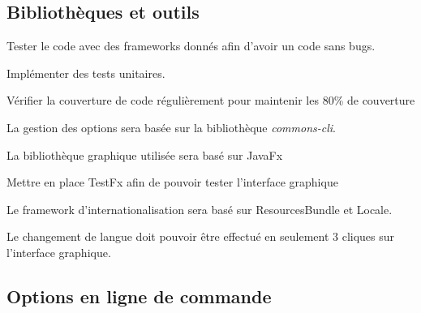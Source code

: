 \documentclass{article}
\begin{document}
\subsection{Bibliothèques et outils}

\begin{nonfunctionnalneedbox}
    Tester le code avec des frameworks donnés afin d'avoir un code sans bugs.
    \begin{subneedbox}
        Implémenter des tests unitaires.
    \end{subneedbox}

    \begin{subneedbox}
        Vérifier la couverture de code régulièrement pour maintenir les 80\% de couverture
    \end{subneedbox}
\end{nonfunctionnalneedbox}

\begin{nonfunctionnalneedbox}
    La gestion des options sera basée sur la bibliothèque \textit{commons-cli}.
\end{nonfunctionnalneedbox}

\begin{nonfunctionnalneedbox}
    La bibliothèque graphique utilisée sera basé sur JavaFx
    \begin{subneedbox}
        Mettre en place TestFx afin de pouvoir tester l'interface graphique
    \end{subneedbox}
\end{nonfunctionnalneedbox}

\begin{nonfunctionnalneedbox}
    Le framework d'internationalisation sera basé sur ResourcesBundle et Locale.
    \begin{subneedbox}
        Le changement de langue doit pouvoir être effectué en seulement 3 cliques
        sur l'interface graphique.
    \end{subneedbox}
\end{nonfunctionnalneedbox}

\subsection{Options en ligne de commande}
\end{document}
